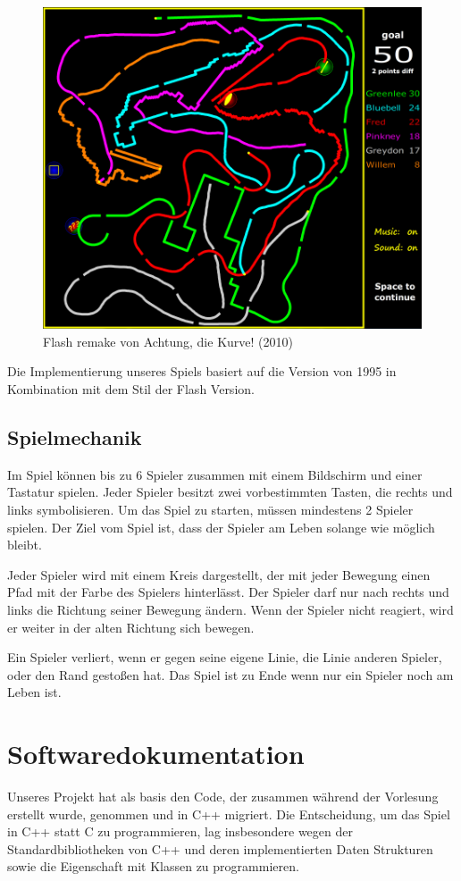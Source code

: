 \documentclass[doktyp=studarbeit]{TUBAFarbeiten}
\begin{document}
\begin{figure}[!h]
	\centering
	\includegraphics[width=0.5\linewidth]{flash-version.png}
	\caption{Flash remake von Achtung, die Kurve! (2010)}
	\label{fig:flash-version}
\end{figure}

Die Implementierung unseres Spiels basiert auf die Version von 1995 in 
Kombination mit dem Stil der Flash Version.

\subsection{Spielmechanik}

Im Spiel können bis zu 6 Spieler zusammen mit einem Bildschirm und einer 
Tastatur spielen. Jeder Spieler besitzt zwei vorbestimmten Tasten, die rechts 
und links symbolisieren. Um das Spiel zu starten, müssen mindestens 
2 Spieler spielen.  Der Ziel vom Spiel ist, dass der Spieler am Leben 
solange wie möglich bleibt.

Jeder Spieler wird mit einem Kreis dargestellt, der mit jeder Bewegung einen 
Pfad mit der Farbe des Spielers hinterlässt. Der Spieler darf nur nach rechts 
und links die Richtung seiner Bewegung ändern. Wenn der Spieler nicht reagiert, 
wird er weiter in der alten Richtung sich bewegen.

Ein Spieler verliert, wenn er gegen seine eigene Linie, die Linie anderen 
Spieler,  oder den Rand gestoßen hat. Das Spiel ist zu Ende wenn nur ein 
Spieler noch am Leben ist.

\section{Softwaredokumentation}

Unseres Projekt hat als basis den Code, der zusammen während der Vorlesung 
erstellt wurde, genommen und in C++ migriert. 
Die Entscheidung, um das Spiel in C++ statt C zu programmieren, lag 
insbesondere wegen der Standardbibliotheken von C++ und deren implementierten 
Daten Strukturen sowie die Eigenschaft mit Klassen zu programmieren.
\end{document}
